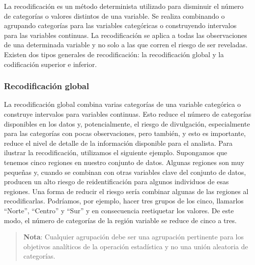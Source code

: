 \documentclass[
]{book}
\theoremstyle{definition}
\theoremstyle{definition}
\theoremstyle{definition}
\theoremstyle{definition}
\theoremstyle{remark}
\begin{document}
La recodificación es un método determinista utilizado para disminuir el número de categorías o valores distintos de una variable. Se realiza combinando o agrupando categorías para las variables categóricas o construyendo intervalos para las variables continuas. La recodificación se aplica a todas las observaciones de una determinada variable y no solo a las que corren el riesgo de ser reveladas. Existen dos tipos generales de recodificación: la recodificación global y la codificación superior e inferior.

\hypertarget{recodificaciuxf3n-global}{%
\subsubsection{Recodificación global}\label{recodificaciuxf3n-global}}

La recodificación global combina varias categorías de una variable categórica o construye intervalos para variables continuas. Esto reduce el número de categorías disponibles en los datos y, potencialmente, el riesgo de divulgación, especialmente para las categorías con pocas observaciones, pero también, y esto es importante, reduce el nivel de detalle de la información disponible para el analista. Para ilustrar la recodificación, utilizamos el siguiente ejemplo. Supongamos que tenemos cinco regiones en nuestro conjunto de datos. Algunas regiones son muy pequeñas y, cuando se combinan con otras variables clave del conjunto de datos, producen un alto riesgo de reidentificación para algunos individuos de esas regiones. Una forma de reducir el riesgo sería combinar algunas de las regiones al recodificarlas. Podríamos, por ejemplo, hacer tres grupos de los cinco, llamarlos ``Norte'', ``Centro'' y ``Sur'' y en consecuencia reetiquetar los valores. De este modo, el número de categorías de la región variable se reduce de cinco a tres.

\begin{quote}
\textbf{Nota}: Cualquier agrupación debe ser una agrupación pertinente para los objetivos analíticos de la operación estadística y no una unión aleatoria de categorías.
\end{quote}
\end{document}
